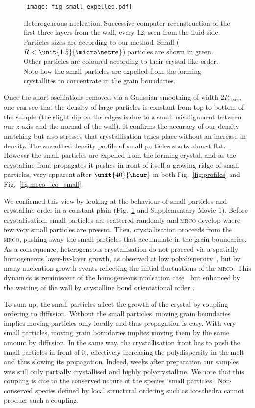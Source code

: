 \documentclass[8.5pt,twoside,twocolumn]{article}
\begin{document}
\begin{figure}
	\centering
	\texttt{[image: fig\_small\_expelled.pdf]}
	\caption{Heterogeneous nucleation. Successive computer reconstruction of the first three layers from the wall, every \unit{12}{\hour}, seen from the fluid side. Particles sizes are according to our method. Small ($R<\unit{1.5}{\micro\metre}$) particles are shown in green. Other particles are coloured according to their crystal-like order. Note how the small particles are expelled from the forming crystallites to concentrate in the grain boundaries.}
	\label{fig:small_expelled}
\end{figure}

Once the short oscillations removed via a Gaussian smoothing of width $2R_\text{peak}$, one can see that the density of large particles is constant from top to bottom of the sample (the slight dip on the edges is due to a small misalignment between our $z$ axis and the normal of the wall). It confirms the accuracy of our density matching but also stresses that crystallisation takes place without an increase in density. The smoothed density profile of small particles starts almost flat. However the small particles are expelled from the forming crystal, and as the crystalline front propagates it pushes in front of itself a growing ridge of small particles, very apparent after $\unit{40}{\hour}$ in both Fig.~\ref{fig:profiles} and Fig.~\ref{fig:mrco_ico_small}.

We confirmed this view by looking at the behaviour of small particles and crystalline order in a constant plain (Fig.~\ref{fig:small_expelled} and Supplementary Movie 1). Before crystallisation, small particles are scattered randomly and \textsc{mrco} develop where few very small particles are present. Then, crystallisation proceeds from the \textsc{mrco}, pushing away the small particles that accumulate in the grain boundaries. As a consequence, heterogeneous crystallisation do not proceed via a spatially homogeneous layer-by-layer growth, as observed at low polydispersity~\cite{Sandomirski2011}, but by many nucleation-growth events reflecting the initial fluctuations of the \textsc{mrco}. This dynamics is reminiscent of the homogeneous nucleation case~\cite{Kawasaki2010c,Russo2012,Russo2012b} but enhanced by the wetting of the wall by crystalline bond orientational order \cite{watanabe2011}.

To sum up, the small particles affect the growth of the crystal by coupling ordering to diffusion. Without the small particles, moving grain boundaries implies moving particles only locally and thus propagation is easy. With very small particles, moving grain boundaries implies moving them by the same amount by diffusion. In the same way, the crystallisation front has to push the small particles in front of it, effectively increasing the polydispersity in the melt and thus slowing its propagation. Indeed, weeks after preparation our samples was still only partially crystallised and highly polycrystalline. We note that this coupling is due to the conserved nature of the species `small particles'. Non-conserved species defined by local structural ordering such as icosahedra cannot produce such a coupling.
\end{document}
